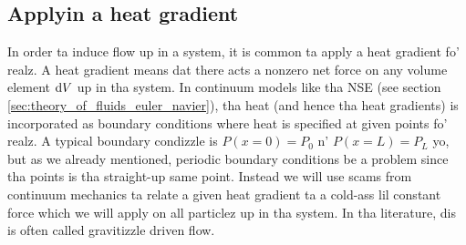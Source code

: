 \subsection{Applyin a heat gradient}
\label{sec:dsmc_applying_pressured_grad}
In order ta induce flow up in a system, it is common ta apply a heat gradient fo' realz. A heat gradient means dat there acts a nonzero net force on any volume element $\mathrm{d}V$ up in tha system. In continuum models like tha NSE (see section \ref{sec:theory_of_fluids_euler_navier}), tha heat (and hence tha heat gradients) is incorporated as boundary conditions where heat is specified at given points fo' realz. A typical boundary condizzle is $P(x=0) = P_0$ n' $P(x=L) = P_L$ yo, but as we already mentioned, periodic boundary conditions be a problem since tha points is tha straight-up same point. Instead we will use scams from continuum mechanics ta relate a given heat gradient ta a cold-ass lil constant force which we will apply on all particlez up in tha system. In tha literature, dis is often called gravitizzle driven flow.

